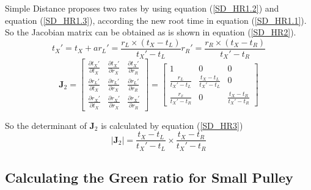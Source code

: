 \documentclass{bmcart}
\begin{document}
\begin{backmatter}
Simple Distance proposes two rates by using equation (\ref{SD_HR1.2}) and equation (\ref{SD_HR1.3}), according the new root time in equation (\ref{SD_HR1.1}). So the Jacobian matrix can be obtained as is shown in equation (\ref{SD_HR2}).
\begin{subequations}\label{SD_HR1}
\begin{equation}\label{SD_HR1.1}
 {t_X}' = {t_X} + a
\end{equation}
\begin{equation} \label{SD_HR1.2}
{r_L}' = \frac{{{r_L} \times ({t_X} - {t_L})}}{{{t_X}' - {t_L}}}
\end{equation}
\begin{equation}\label{SD_HR1.3}
  {r_R}' = \frac{{{r_R} \times ({t_X} - {t_R})}}{{{t_X}' - {t_R}}}
\end{equation}
\end{subequations}
\begin{equation}\label{SD_HR2}
{{\mathbf{J}}_2} = \left[ {\begin{array}{*{20}{c}}
  {\frac{{\partial {t_X}'}}{{\partial {t_X}}}}&{\frac{{\partial {t_X}'}}{{\partial {r_X}}}}&{\frac{{\partial {t_X}'}}{{\partial {r_R}}}} \\
  {\frac{{\partial {r_L}'}}{{\partial {t_X}}}}&{\frac{{\partial {r_L}'}}{{\partial {r_X}}}}&{\frac{{\partial {r_L}'}}{{\partial {r_R}}}} \\
  {\frac{{\partial {r_X}'}}{{\partial {t_X}}}}&{\frac{{\partial {r_X}'}}{{\partial {r_X}}}}&{\frac{{\partial {r_X}'}}{{\partial {r_R}}}}
\end{array}} \right] = \left[ {\begin{array}{*{20}{c}}
  1&0&0 \\
  {\frac{{{r_L}}}{{{t_X}' - {t_L}}}}&{\frac{{{t_X} - {t_L}}}{{{t_X}' - {t_L}}}}&0 \\
  {\frac{{{r_x}}}{{{t_X}' - {t_R}}}}&0&{\frac{{{t_X} - {t_R}}}{{{t_X}' - {t_R}}}}
\end{array}} \right]
\end{equation}

So the determinant of ${{\mathbf{J}}_2}$ is calculated by equation (\ref{SD_HR3})
\begin{equation}\label{SD_HR3}
\left| {{{\mathbf{J}}_2}} \right| = \frac{{{t_X} - {t_L}}}{{{t_X}' - {t_L}}} \times \frac{{{t_X} - {t_R}}}{{{t_X}' - {t_R}}}
\end{equation}
\subsection*{Calculating the Green ratio for Small Pulley}


\end{backmatter}
\end{document}
